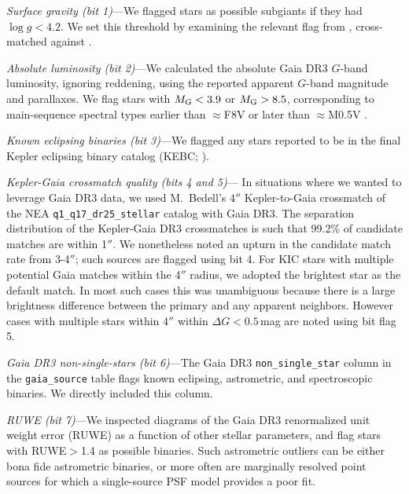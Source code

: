 \documentclass[11pt,twocolumn,tighten]{aastex63}
\begin{document}
{\it Surface gravity (bit 1)}---We flagged stars as possible subgiants
if they had $\log g < 4.2$.  We set this threshold by examining the
relevant flag from \citet{berger_2018_radii_evolnstates},
cross-matched against \citet{Berger_2020a_catalog}.

{\it Absolute luminosity (bit 2)}---We calculated the absolute Gaia
DR3 $G$-band luminosity, ignoring reddening, using the reported
apparent $G$-band magnitude and parallaxes.  We flag stars with
$M_{\rm G} < 3.9$ or $M_{\rm G} > 8.5$, corresponding to main-sequence
spectral types earlier than $\approx$F8V or later than $\approx$M0.5V
\citep{Pecaut_2013}.

{\it Known eclipsing binaries (bit 3)}---We flagged any stars reported
to be in the final Kepler eclipsing binary catalog (KEBC;
\citealt{2016AJ....151...68K}).

{\it Kepler-Gaia crossmatch quality (bits 4 and 5)}--- In situations
where we wanted to leverage Gaia DR3 data, we used M.~Bedell's 4$''$
Kepler-to-Gaia crossmatch %
of the NEA \texttt{q1\_q17\_dr25\_stellar} catalog with Gaia DR3.  The
separation distribution of the Kepler-Gaia DR3 crossmatches is such
that 99.2\% of candidate matches are within 1$''$.   We nonetheless
noted an upturn in the candidate match rate from 3-4$''$; such sources
are flagged using bit 4.  For KIC stars with multiple potential Gaia
matches within the 4$''$ radius, we adopted the brightest star as the
default match.  In most such cases this was unambiguous because there
is a large brightness difference between the primary and any apparent
neighbors.  However cases with multiple stars within 4$''$ within
$\Delta G$$<$$0.5$\,mag are noted using bit flag 5.  

{\it Gaia DR3 non-single-stars (bit 6)}---The Gaia DR3
\texttt{non\_single\_star} column in the \texttt{gaia\_source} table
flags known eclipsing, astrometric, and spectroscopic binaries.  We
directly included this column.

{\it RUWE (bit 7)}---We inspected diagrams of the Gaia DR3
renormalized unit weight error (RUWE) as a function of other stellar
parameters, and flag stars with RUWE$>$1.4 as possible binaries.  Such
astrometric outliers can be either bona fide astrometric binaries, or
more often are marginally resolved point sources for which a
single-source PSF model provides a poor fit.
\end{document}
